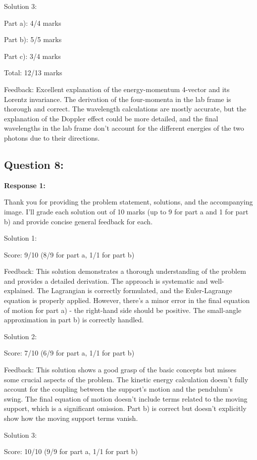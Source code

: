 \documentclass[a4paper,11pt]{article}
\begin{document}
Solution 3:

Part a): 4/4 marks

Part b): 5/5 marks

Part c): 3/4 marks

Total: 12/13 marks

Feedback: Excellent explanation of the energy-momentum 4-vector and its Lorentz invariance. The derivation of the four-momenta in the lab frame is thorough and correct. The wavelength calculations are mostly accurate, but the explanation of the Doppler effect could be more detailed, and the final wavelengths in the lab frame don't account for the different energies of the two photons due to their directions.

\subsection*{Question 8:}

\textbf{Response 1:}

Thank you for providing the problem statement, solutions, and the accompanying image. I'll grade each solution out of 10 marks (up to 9 for part a and 1 for part b) and provide concise general feedback for each.

Solution 1:

Score: 9/10 (8/9 for part a, 1/1 for part b)

Feedback: This solution demonstrates a thorough understanding of the problem and provides a detailed derivation. The approach is systematic and well-explained. The Lagrangian is correctly formulated, and the Euler-Lagrange equation is properly applied. However, there's a minor error in the final equation of motion for part a) - the right-hand side should be positive. The small-angle approximation in part b) is correctly handled.

Solution 2:

Score: 7/10 (6/9 for part a, 1/1 for part b)

Feedback: This solution shows a good grasp of the basic concepts but misses some crucial aspects of the problem. The kinetic energy calculation doesn't fully account for the coupling between the support's motion and the pendulum's swing. The final equation of motion doesn't include terms related to the moving support, which is a significant omission. Part b) is correct but doesn't explicitly show how the moving support terms vanish.

Solution 3:

Score: 10/10 (9/9 for part a, 1/1 for part b)
\end{document}
